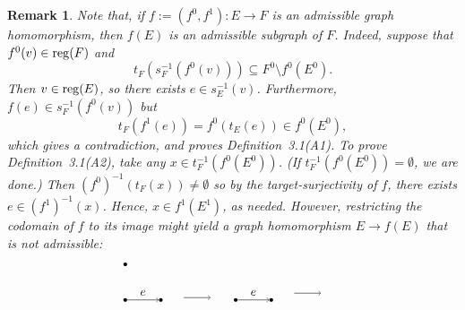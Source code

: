 \documentclass[12pt,times,a4paper]{amsart}
\newtheorem{remark}[theorem]{Remark}
\numberwithin{equation}{section}
\numberwithin{equation}{section}
\begin{document}
\begin{remark} \label{remark3.5}
{\rm Note that, if $f:=(f^0,f^1):E\to F$ is an admissible graph homomorphism, then $f(E)$ is an admissible subgraph of $F$. 
Indeed, suppose that $f^0(v)\in {\rm reg}(F)$ and 
\begin{equation}
t_F(s_F^{-1}(f^0(v)))\subseteq F^0\setminus f^0(E^0).
\end{equation}
Then $v\in {\rm reg}(E)$, so there exists 
$e\in s_E^{-1}(v)$. Furthermore, $f(e)\in s_F^{-1}(f^0(v))$ but 
\begin{equation}
t_F(f^1(e))=f^0(t_E(e))\in f^0(E^0),
\end{equation}
which gives a contradiction, and proves 
Definition~3.1(A1). To prove Definition~3.1(A2), take any $x\in t_F^{-1}(f^0(E^0))$. (If $t_F^{-1}(f^0(E^0))=\emptyset$, we are done.) 
Then $(f^0)^{-1}(t_F(x))\neq\emptyset$ so by the target-surjectivity of $f$, there exists $e\in (f^1)^{-1}(x)$. Hence, $x\in f^1(E^1)$, as needed. 
However, restricting the codomain of $f$ to its image might yield a  graph homomorphism $E\to f(E)$ that is not  admissible:
\begin{equation}
\begin{tikzpicture}[auto,swap]
\tikzstyle{vertex}=[circle,fill=black,minimum size=3pt,inner sep=0pt]
\tikzstyle{edge}=[draw,->]
\tikzstyle{cycle1}=[draw,->,out=130, in=50, loop, distance=30pt]
   
\node[vertex] (0) at (0,0) {};
\node[vertex] (1) at (0,-1) {};
\node[vertex] (2) at (1,-1) {};

\path (1) edge[draw,->] node[above] {$e$} (2);
\end{tikzpicture}\quad 
\begin{tikzpicture} 
\node (0) at (0,1) {};
\node (1) at (1,1) {};
\path (0) edge[draw,->] node[above] {} (1);
\end{tikzpicture}\quad
\begin{tikzpicture}[auto,swap]
\tikzstyle{vertex}=[circle,fill=black,minimum size=3pt,inner sep=0pt]
\tikzstyle{edge}=[draw,->]
\tikzstyle{cycle1}=[draw,->,out=130, in=50, loop, distance=30pt]

\node (-1) at (0,0) {};   
\node[vertex] (0) at (0,-1) {};
\node[vertex] (1) at (1,-1) {};


\path (0) edge[edge] node[above] {$e$} (1);

\end{tikzpicture}\quad
\begin{tikzpicture} 
\node (0) at (0,1) {};
\node (1) at (1,1) {};
\path (0) edge[draw,->] node[below] {${}$} (1);
\end{tikzpicture}\quad
\begin{tikzpicture}[auto,swap]
\tikzstyle{vertex}=[circle,fill=black,minimum size=3pt,inner sep=0pt]
\tikzstyle{edge}=[draw,->]
\tikzstyle{cycle1}=[draw,->,out=130, in=50, loop, distance=30pt]
   

\end{tikzpicture}
\end{equation}}
\end{remark}
\end{document}
